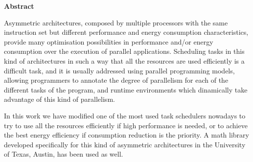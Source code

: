 
\cleardoublepage

\thispagestyle{empty}

\begin{center}

{\bf \Huge Abstract}

  \end{center}
\vspace{1cm}

Asymmetric architectures, composed by multiple processors with the same
instruction set but different performance and energy consumption
characteristics, provide many optimisation possibilities in performance
and/or energy consumption over the execution of parallel
applications. Scheduling tasks in this kind of architectures in such a way
that all the resources are used efficiently is a difficult task, and it is
usually addressed using parallel programming models, allowing programmers
to annotate the degree of parallelism for each of the different tasks of
the program, and runtime environments which dinamically take advantage of
this kind of parallelism.



In this work we have modified one of the most used task schedulers nowadays
to try to use all the resources efficiently if high performance is needed,
or to achieve the best energy efficiency if consumption reduction is the
priority. A math library developed specifically for this kind of asymmetric
architectures in the University of Texas, Austin, has been used as well.



